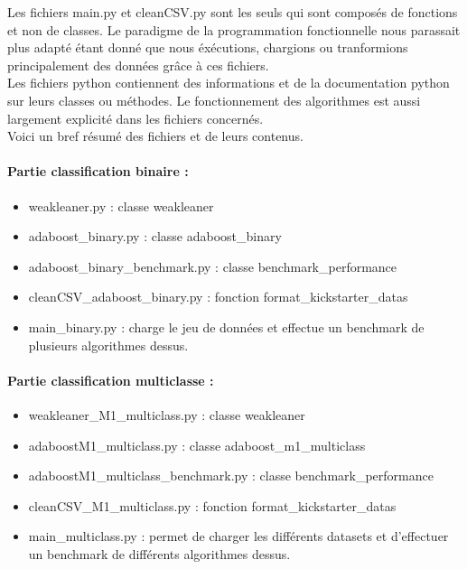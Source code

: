 \documentclass{article}
\begin{document}
Les fichiers main.py et cleanCSV.py sont les seuls qui sont composés de fonctions et non de classes. Le paradigme de la programmation fonctionnelle nous parassait plus adapté étant donné que nous éxécutions, chargions ou tranformions principalement des données grâce à ces fichiers.\\

Les fichiers python contiennent des informations et de la documentation python sur leurs classes ou méthodes. 
Le fonctionnement des algorithmes est aussi largement explicité dans les fichiers concernés.\\

Voici un bref résumé des fichiers et de leurs contenus. \\

\paragraph{Partie classification binaire : }
\begin{itemize}
  \item weakleaner.py : classe weakleaner
  \item adaboost\_binary.py : classe adaboost\_binary
  \item adaboost\_binary\_benchmark.py : classe benchmark\_performance
  \item cleanCSV\_adaboost\_binary.py : fonction format\_kickstarter\_datas
  \item main\_binary.py : charge le jeu de données et effectue un benchmark de plusieurs algorithmes dessus.
\end{itemize}

\paragraph{Partie classification multiclasse : }


\begin{itemize}
  \item weakleaner\_M1\_multiclass.py : classe weakleaner
  \item adaboostM1\_multiclass.py : classe adaboost\_m1\_multiclass
  \item adaboostM1\_multiclass\_benchmark.py : classe benchmark\_performance
  \item cleanCSV\_M1\_multiclass.py : fonction format\_kickstarter\_datas
  \item main\_multiclass.py : permet de charger les différents datasets et d'effectuer un benchmark de différents algorithmes dessus. 
\end{itemize}
\end{document}
